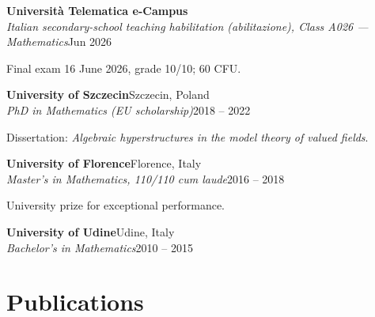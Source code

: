 \documentclass[10pt,a4paper]{article}
\newcommand{\entry}[4]{%
  \textbf{#1}\hfill #2\\
  \textit{#3}\hfill #4\par\vspace{0.6em}}
\begin{document}
\entry{Universit\`a Telematica e-Campus}{}
  {Italian secondary-school teaching habilitation (abilitazione), Class A026 --- Mathematics}{Jun 2026}
\vspace{-0.4em}
Final exam 16 June 2026, grade 10/10; 60 CFU.\par\vspace{0.6em}

\entry{University of Szczecin}{Szczecin, Poland}
  {PhD in Mathematics (EU scholarship)}{2018 -- 2022}
\vspace{-0.4em}
Dissertation: \emph{Algebraic hyperstructures in the model theory of valued fields}.\par\vspace{0.6em}

\entry{University of Florence}{Florence, Italy}
  {Master's in Mathematics, 110/110 cum laude}{2016 -- 2018}
\vspace{-0.4em}
University prize for exceptional performance.\par\vspace{0.6em}

\entry{University of Udine}{Udine, Italy}
  {Bachelor's in Mathematics}{2010 -- 2015}

\section*{Publications}
\end{document}
